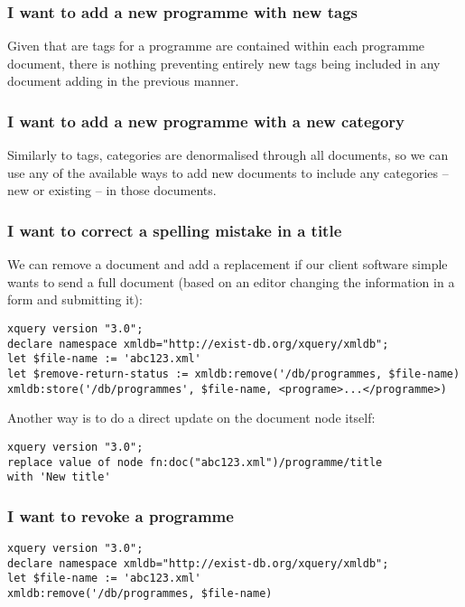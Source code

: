 \documentclass[11pt,a4paper]{article}
\begin{document}
\subsubsection{I want to add a new programme with new tags}

Given that are tags for a programme are contained within each programme
document, there is nothing preventing entirely new tags being included
in any document adding in the previous manner.

\subsubsection{I want to add a new programme with a new category}

Similarly to tags, categories are denormalised through all documents, so
we can use any of the available ways to add new documents to include
any categories -- new or existing -- in those documents.

\pagebreak

\subsubsection{I want to correct a spelling mistake in a title}

We can remove a document and add a replacement if our client
software simple wants to send a full document (based on an editor
changing the information in a form and submitting it):

\begin{lstlisting}
xquery version "3.0";
declare namespace xmldb="http://exist-db.org/xquery/xmldb";
let $file-name := 'abc123.xml'
let $remove-return-status := xmldb:remove('/db/programmes, $file-name)
xmldb:store('/db/programmes', $file-name, <programe>...</programme>)
\end{lstlisting}

Another way is to do a direct update on the document node itself:

\begin{lstlisting}
xquery version "3.0";
replace value of node fn:doc("abc123.xml")/programme/title
with 'New title'
\end{lstlisting}

\subsubsection{I want to revoke a programme}

\begin{lstlisting}
xquery version "3.0";
declare namespace xmldb="http://exist-db.org/xquery/xmldb";
let $file-name := 'abc123.xml'
xmldb:remove('/db/programmes, $file-name)
\end{lstlisting}
\end{document}
